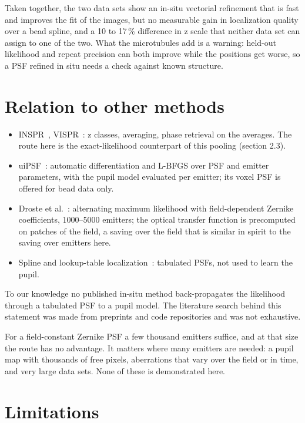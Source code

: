 \documentclass[11pt,a4paper]{article}
\begin{document}
Taken together, the two data sets show an in-situ vectorial refinement that is fast and improves the fit of the
images, but no measurable gain in localization quality over a bead spline, and a 10 to 17\,\% difference in
z scale that neither data set can assign to one of the two. What the microtubules add is a warning: held-out
likelihood and repeat precision can both improve while the positions get worse, so a PSF refined in situ needs
a check against known structure.

\section{Relation to other methods}

\begin{itemize}\setlength\itemsep{1pt}
\item INSPR~\cite{inspr}, VISPR~\cite{vispr}: z classes, averaging, phase retrieval on the averages. The route
here is the exact-likelihood counterpart of this pooling (section 2.3).
\item uiPSF~\cite{uipsf}: automatic differentiation and L-BFGS over PSF and emitter parameters, with the pupil
model evaluated per emitter; its voxel PSF is offered for bead data only.
\item Droste et al.~\cite{droste}: alternating maximum likelihood with field-dependent Zernike coefficients,
1000--5000 emitters; the optical transfer function is precomputed on patches of the field, a saving over the
field that is similar in spirit to the saving over emitters here.
\item Spline and lookup-table localization~\cite{cspline,hauser}: tabulated PSFs, not used to learn the pupil.
\end{itemize}
To our knowledge no published in-situ method back-propagates the likelihood through a tabulated PSF to a pupil
model. The literature search behind this statement was made from preprints and code repositories and was not
exhaustive.

For a field-constant Zernike PSF a few thousand emitters suffice, and at that size the route has no advantage.
It matters where many emitters are needed: a pupil map with thousands of free pixels, aberrations that vary
over the field or in time, and very large data sets. None of these is demonstrated here.

\section{Limitations}
\end{document}
